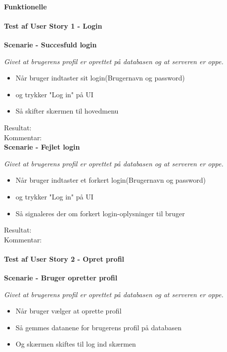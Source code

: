 \paragraph{Funktionelle}
\paragraph{Test af User Story 1 - Login}

\bf{Scenarie - Succesfuld login}

\it{Givet at brugerens profil er oprettet på databasen og at serveren er oppe.}

\begin{itemize}
  \item Når bruger indtaster sit login(Brugernavn og password)
  \item og trykker "Log in" på UI
  \item Så skifter skærmen til hovedmenu
\end{itemize}

Resultat:\\
Kommentar:\\

\bf{Scenarie - Fejlet login}

\it{Givet at brugerens profil er oprettet på databasen og at serveren er oppe.}

\begin{itemize}
  \item Når bruger indtaster et forkert login(Brugernavn og password)
  \item og trykker "Log in" på UI
  \item Så signaleres der om forkert login-oplysninger til bruger
\end{itemize}

Resultat:\\
Kommentar:\\

\paragraph{Test af User Story 2 - Opret profil}

\bf{Scenarie - Bruger opretter profil}

\it{Givet at brugerens profil er oprettet på databasen og at serveren er oppe.}

\begin{itemize}
  \item Når bruger vælger at oprette profil
  \item Så gemmes datanene for brugerens profil på databasen
  \item Og skærmen skiftes til log ind skærmen
\end{itemize}

